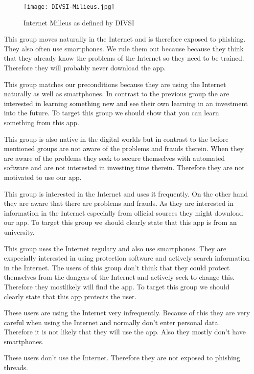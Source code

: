 \begin{figure}[hHtbp]
\centering
\texttt{[image: DIVSI-Milieus.jpg]}
\caption{Internet Milleus as defined by DIVSI}
\label{fig:divsi_milieus}
\end{figure}

\begin{description}[leftmargin=0cm]
\item[Digital Souver\"{a}ne] This group moves naturally in the Internet and is therefore exposed to phishing. They also often use smartphones. We rule them out because because they think that they already know the problems of the Internet so they need to be trained. Therefore they will probably never download the app.
\item[Effizienzorientierte Performer] This group matches our preconditions because they are using the Internet naturally as well as smartphones. In contrast to the previous group the are interested in learning something new and see their own learning in an investment into the future. To target this group we should show that you can learn something from this app.
\item[Unbek\"{u}mmerte Hedonisten] This group is also native in the digital worlds but in contrast to the before mentioned groups are not aware of the problems and frauds therein. When they are aware of the problems they seek to secure themselves with automated software and are not interested in investing time therein. Therefore they are not motivated to use our app.
\item[Postmaterielle Skeptiker] This group is interested in the Internet and uses it frequently. On the other hand they are aware that there are problems and frauds. As they are interested in information in the Internet especially from official sources they might download our app. To target this group we should clearly state that this app is from an university.
\item[Verantwortungsbedachte Etablierte] This group uses the Internet regulary and also use smartphones. They are exspecially interested in using protection software and actively search information in the Internet. The users of this group don't think that they could protect themselves from the dangers of the Internet and actively seek to change this. Therefore they mostlikely will find the app. To target this group we should clearly state that this app protects the user.
\item[Ordnungsfordernde Internet-Laien] These users are using the Internet very infrequently. Because of this they are very careful when using the Internet and normally don't enter personal data. Therefore it is not likely that they will use the app. Also they mostly don't have smartphones.
\item[Internetferne Verunsicherte] These users don't use the Internet. Therefore they are not exposed to phishing threads.
\end{description}

